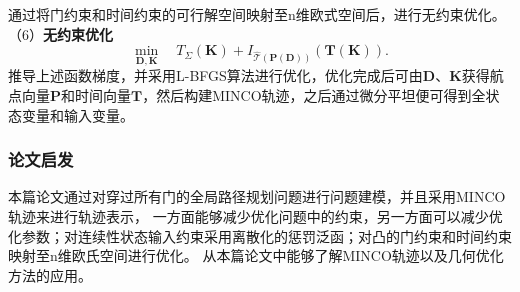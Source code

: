 通过将门约束和时间约束的可行解空间映射至n维欧式空间后，进行无约束优化。\\
（6）\textbf{无约束优化}
\begin{equation}
    \min_{\mathbf{D},\mathbf{K}}\quad T_{\Sigma}(\mathbf{K})+I_{\hat{\mathcal{T}}(\mathbf{P}(\mathbf{D}))}(\mathbf{T}(\mathbf{K})).
\end{equation}
推导上述函数梯度，并采用L-BFGS算法进行优化，优化完成后可由$\mathbf{D、K}$获得航点向量$\mathbf{P}$和时间向量$\mathbf{T}$，然后构建MINCO轨迹，之后通过微分平坦便可得到全状态变量和输入变量。
\subsubsection{论文启发}
本篇论文通过对穿过所有门的全局路径规划问题进行问题建模，并且采用MINCO轨迹来进行轨迹表示，
一方面能够减少优化问题中的约束，另一方面可以减少优化参数；对连续性状态输入约束采用离散化的惩罚泛函；对凸的门约束和时间约束映射至n维欧氏空间进行优化。
从本篇论文中能够了解MINCO轨迹以及几何优化方法的应用。
